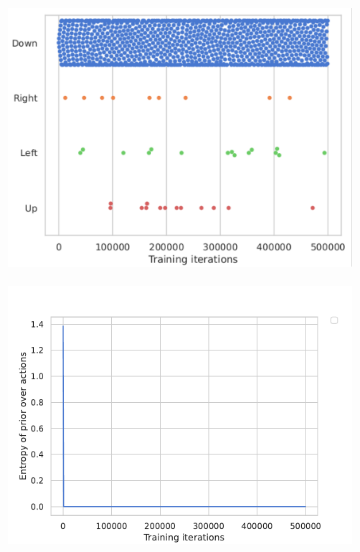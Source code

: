 \documentclass[twoside,11pt]{article}
\begin{document}
\begin{figure}[H]
    \centering
    \begin{subfigure}{.4\textwidth}
        \centering
        \includegraphics[draft=false,width=\linewidth]{ActionPicked_efe_3}
        \caption{}\label{fig:action_picked_efe}
    \end{subfigure}%
    \begin{subfigure}{.4\textwidth}
        \centering
        \includegraphics[draft=false,width=\linewidth]{EntropyPriorActions_efe_3}
        \caption{}\label{fig:entropy_action_efe}
    \end{subfigure}
    \begin{subfigure}{.4\textwidth}
        \centering

\end{subfigure}
\end{figure}
\end{document}
